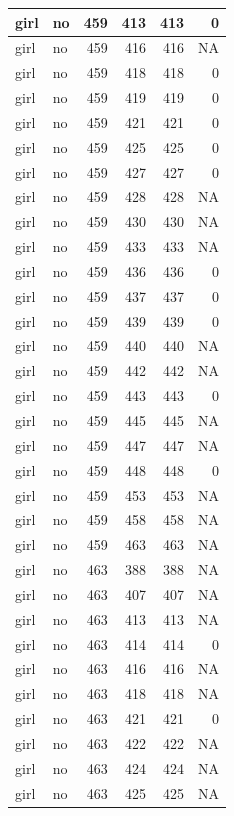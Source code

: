 \documentclass[man]{apa6}
\begin{document}
\begin{tabular}{l|l|r|r|r|r}
\hline
girl & no & 459 & 413 & 413 & 0\\
\hline
girl & no & 459 & 416 & 416 & NA\\
\hline
girl & no & 459 & 418 & 418 & 0\\
\hline
girl & no & 459 & 419 & 419 & 0\\
\hline
girl & no & 459 & 421 & 421 & 0\\
\hline
girl & no & 459 & 425 & 425 & 0\\
\hline
girl & no & 459 & 427 & 427 & 0\\
\hline
girl & no & 459 & 428 & 428 & NA\\
\hline
girl & no & 459 & 430 & 430 & NA\\
\hline
girl & no & 459 & 433 & 433 & NA\\
\hline
girl & no & 459 & 436 & 436 & 0\\
\hline
girl & no & 459 & 437 & 437 & 0\\
\hline
girl & no & 459 & 439 & 439 & 0\\
\hline
girl & no & 459 & 440 & 440 & NA\\
\hline
girl & no & 459 & 442 & 442 & NA\\
\hline
girl & no & 459 & 443 & 443 & 0\\
\hline
girl & no & 459 & 445 & 445 & NA\\
\hline
girl & no & 459 & 447 & 447 & NA\\
\hline
girl & no & 459 & 448 & 448 & 0\\
\hline
girl & no & 459 & 453 & 453 & NA\\
\hline
girl & no & 459 & 458 & 458 & NA\\
\hline
girl & no & 459 & 463 & 463 & NA\\
\hline
girl & no & 463 & 388 & 388 & NA\\
\hline
girl & no & 463 & 407 & 407 & NA\\
\hline
girl & no & 463 & 413 & 413 & NA\\
\hline
girl & no & 463 & 414 & 414 & 0\\
\hline
girl & no & 463 & 416 & 416 & NA\\
\hline
girl & no & 463 & 418 & 418 & NA\\
\hline
girl & no & 463 & 421 & 421 & 0\\
\hline
girl & no & 463 & 422 & 422 & NA\\
\hline
girl & no & 463 & 424 & 424 & NA\\
\hline
girl & no & 463 & 425 & 425 & NA\\

\end{tabular}
\end{document}
